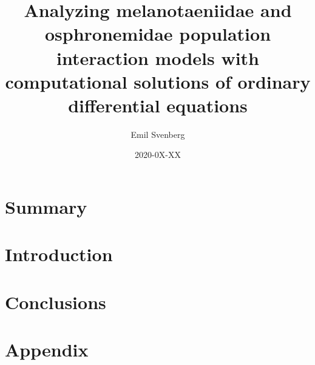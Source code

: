 \documentclass{article}
\title{Analyzing melanotaeniidae and osphronemidae population interaction models with computational solutions of ordinary differential equations}
\author{Emil Svenberg}
\date{2020-0X-XX}
\begin{document}
\maketitle

\section{Summary}
\section{Introduction}



\section{Conclusions}
\section{Appendix}
\end{document}
